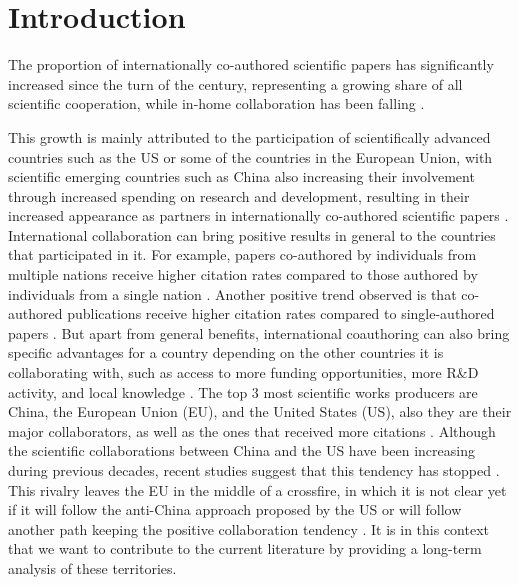 \section{Introduction}
\label{sec:introduction}

The proportion of internationally co-authored scientific papers has significantly increased since the turn of the century, representing a growing share of all scientific cooperation, while in-home collaboration has been falling \citep{adams2013fourth, choi2015quantifying,wagner2015continuing}.

This growth is mainly attributed to the participation of scientifically advanced countries such as the US or some of the countries in the European Union, with scientific emerging countries such as China also increasing their involvement through increased spending on research and development, resulting in their increased appearance as partners in internationally co-authored scientific papers \cite{wagner2015continuing}.
International collaboration can bring positive results in general to the countries that participated in it. For example, papers co-authored by individuals from multiple nations receive higher citation rates compared to those authored by individuals from a single nation \citep{levitt2010does,glanzel2001double,kwiek2021globalization}. Another positive trend observed is that co-authored publications receive higher citation rates compared to single-authored papers \citep{ronda2022immediacy, shen2021correlation}. But apart from general benefits, international coauthoring can also bring specific advantages for a country depending on the other countries it is collaborating with, such as access to more funding opportunities, more R\&D activity, and local knowledge \citep{lee2020winners,harhoff2014channels}.
The top 3 most scientific works producers are China, the European Union (EU), and the United States (US), also they are their major collaborators, as well as the ones that received more citations \citep{wang2017network,zhang2018china, burke2022state}. Although the scientific collaborations between China and the US have been increasing during previous decades, recent studies suggest that this tendency has stopped \citep{schuller2020united,cai2021international,lacey2021technological,zhao2019technology}. This rivalry leaves the EU in the middle of a crossfire, in which it is not clear yet if it will follow the anti-China approach proposed by the US or will follow another path keeping the positive collaboration tendency \citep{schuller2020united,ullah2020eu}. It is in this context that we want to contribute to the current literature by providing a long-term analysis of these territories.
